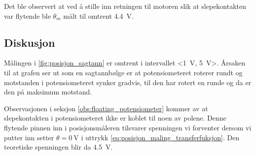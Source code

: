 \label{obs:floating_potensiometer}
Det ble observert at ved å stille inn retningen til motoren slik at slepekontakten var flytende ble $\theta_m$ målt til omtrent \SI{4.4}{\volt}.








\subsection{Diskusjon}

Målingen i \autoref{fig:posisjon_sagtann} er omtrent i intervallet <\SI{1}{\volt}, \SI{5}{\volt}>. Årsaken til at grafen ser ut som en sagtannbølge er at potensiometeret roterer rundt og motstanden i potensiometeret synker gradvis, til den har rotert en runde og da er den på maksimum motstand.


Observasjonen i seksjon \ref{obs:floating_potensiometer} kommer av at slepekontakten i potensiometeret ikke er koblet til noen av polene. Denne flytende pinnen inn i posisjonsmåleren tilsvarer spenningen vi forventer dersom vi putter inn setter $\theta = \SI{0}{\volt}$ i uttrykk \eqref{eq:posisjon_maling_transferfuksjon}. Den teoretiske spenningen blir da \SI{4.5}{\volt}.
